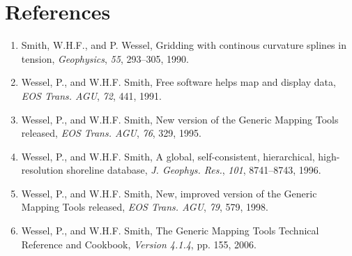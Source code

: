 \documentclass{report}
\begin{document}
\chapter{References} 
\thispagestyle{headings}

\begin{enumerate}

\item Smith, W.H.F., and P. Wessel, Gridding with continous curvature
splines in tension, {\it Geophysics}, {\it 55}, 293--305, 1990.

\item Wessel, P., and W.H.F. Smith, Free software helps map and
display data, {\it EOS Trans. AGU}, {\it 72}, 441, 1991.

\item Wessel, P., and W.H.F. Smith, New version of the Generic
Mapping Tools released, {\it EOS Trans. AGU}, {\it 76}, 329, 1995.

\item Wessel, P., and W.H.F. Smith, A global, self-consistent,
hierarchical, high-resolution shoreline database, {\it J. Geophys. Res.},
{\it 101}, 8741--8743, 1996.

\item Wessel, P., and W.H.F. Smith, New, improved version of the Generic
Mapping Tools released, {\it EOS Trans. AGU}, {\it 79}, 579, 1998.

\item Wessel, P., and W.H.F. Smith, The Generic Mapping Tools Technical Reference and Cookbook, {\it Version 4.1.4}, pp. 155, 2006.

\end{enumerate}

\clearpage
\thispagestyle{headings}
\printindex
\thispagestyle{headings}
\end{document}
